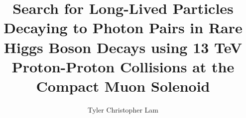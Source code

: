 \documentclass[PhD]{uclathes}
\title{
	Search for Long-Lived Particles Decaying to Photon Pairs in Rare Higgs Boson Decays using 13 TeV Proton-Proton Collisions at the Compact Muon Solenoid
}
\author{Tyler Christopher Lam}
\begin{document}
\makeintropages






\begin{appendices}
	
\end{appendices}


\end{document}
